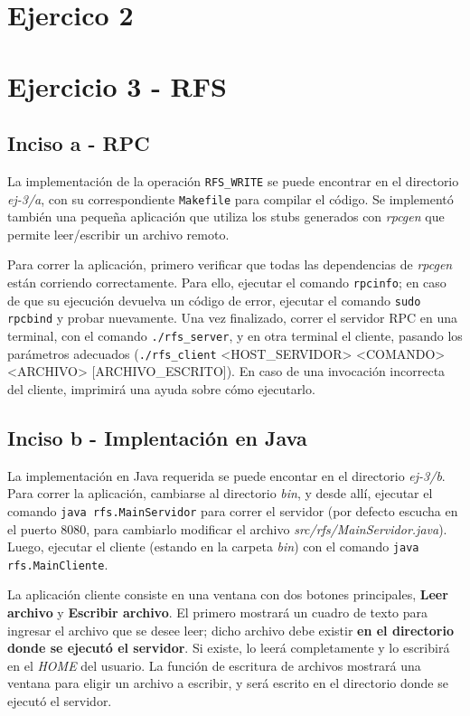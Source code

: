 \section{Ejercico 2}

\section{Ejercicio 3 - RFS}

\subsection{Inciso a - RPC}

La implementación de la operación \texttt{RFS\_WRITE} se puede encontrar en el directorio \emph{ej-3/a}, con su correspondiente \texttt{Makefile} para compilar el código. Se implementó también una pequeña aplicación que utiliza los stubs generados con \emph{rpcgen} que permite leer/escribir un archivo remoto.

Para correr la aplicación, primero verificar que todas las dependencias de \emph{rpcgen} están corriendo correctamente. Para ello, ejecutar el comando \texttt{rpcinfo}; en caso de que su ejecución devuelva un código de error, ejecutar el comando \texttt{sudo rpcbind} y probar nuevamente. Una vez finalizado, correr el servidor RPC en una terminal, con el comando \texttt{./rfs\_server}, y en otra terminal el cliente, pasando los parámetros adecuados (\texttt{./rfs\_client} <HOST\_SERVIDOR> <COMANDO> <ARCHIVO> [ARCHIVO\_ESCRITO]). En caso de una invocación incorrecta del cliente, imprimirá una ayuda sobre cómo ejecutarlo.

\subsection{Inciso b - Implentación en Java}

La implementación en Java requerida se puede encontar en el directorio \emph{ej-3/b}. Para correr la aplicación, cambiarse al directorio \emph{bin}, y desde allí, ejecutar el comando \texttt{java rfs.MainServidor} para correr el servidor (por defecto escucha en el puerto 8080, para cambiarlo modificar el archivo \emph{src/rfs/MainServidor.java}). Luego, ejecutar el cliente (estando en la carpeta \emph{bin}) con el comando \texttt{java rfs.MainCliente}.

La aplicación cliente consiste en una ventana con dos botones principales, \textbf{Leer archivo} y \textbf{Escribir archivo}. El primero mostrará un cuadro de texto para ingresar el archivo que se desee leer; dicho archivo debe existir \textbf{en el directorio donde se ejecutó el servidor}. Si existe, lo leerá completamente y lo escribirá en el \emph{HOME} del usuario. La función de escritura de archivos mostrará una ventana para eligir un archivo a escribir, y será escrito en el directorio donde se ejecutó el servidor. 

